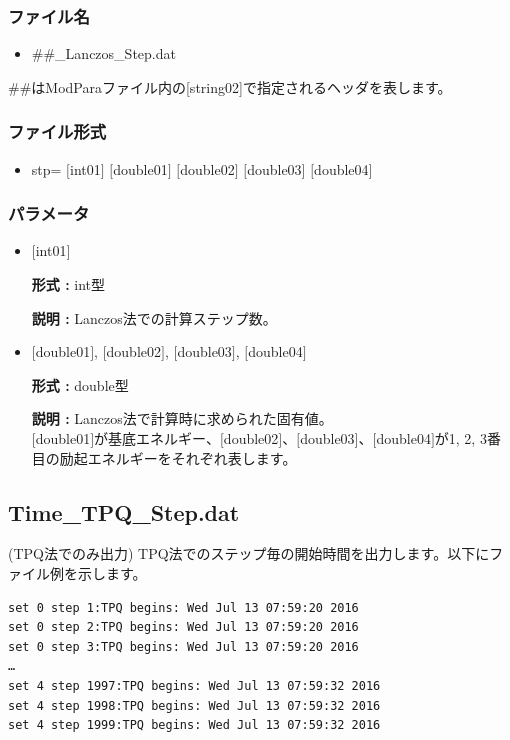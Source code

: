 \subsubsection{ファイル名}
 \begin{itemize}
   \item  \#\#\_Lanczos\_Step.dat
  \end{itemize}
  \#\#はModParaファイル内の[string02]で指定されるヘッダを表します。


\subsubsection{ファイル形式}
 \begin{itemize}
   \item stp= $[$int01$]$ $[$double01$]$ $[$double02$]$ $[$double03$]$ $[$double04$]$
  \end{itemize}
\subsubsection{パラメータ}
 \begin{itemize}

  \item  $[$int01$]$
  
 {\bf 形式 :} int型

{\bf 説明 :} Lanczos法での計算ステップ数。
 
  \item  $[$double01$]$, $[$double02$]$, $[$double03$]$, $[$double04$]$

 {\bf 形式 :} double型 

{\bf 説明 :} Lanczos法で計算時に求められた固有値。\\
$[$double01$]$が基底エネルギー、$[$double02$]$、$[$double03$]$、$[$double04$]$が1, 2, 3番目の励起エネルギーをそれぞれ表します。

 \end{itemize}

\newpage
\subsection{Time\_TPQ\_Step.dat}
(TPQ法でのみ出力) TPQ法でのステップ毎の開始時間を出力します。以下にファイル例を示します。\\
\begin{minipage}{15cm}
\begin{screen}
\begin{verbatim}
set 0 step 1:TPQ begins: Wed Jul 13 07:59:20 2016
set 0 step 2:TPQ begins: Wed Jul 13 07:59:20 2016
set 0 step 3:TPQ begins: Wed Jul 13 07:59:20 2016
…
set 4 step 1997:TPQ begins: Wed Jul 13 07:59:32 2016
set 4 step 1998:TPQ begins: Wed Jul 13 07:59:32 2016
set 4 step 1999:TPQ begins: Wed Jul 13 07:59:32 2016
\end{verbatim}
\end{screen}
\end{minipage}

